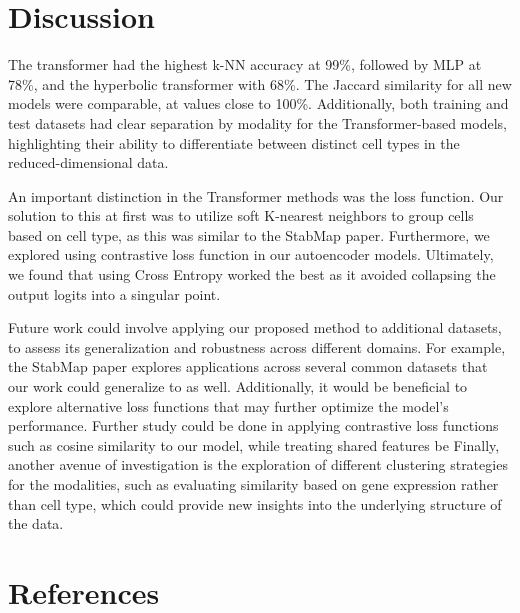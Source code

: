 \documentclass[11pt,a4paper]{article}
\begin{document}
\section{Discussion}



The transformer had the highest k-NN accuracy at 99\%, followed by MLP at 78\%, and the hyperbolic transformer with 68\%. The Jaccard similarity for all new models were comparable, at values close to 100\%. Additionally, both  training and test datasets had clear separation by modality for the Transformer-based models, highlighting their ability to differentiate between distinct cell types in the reduced-dimensional data.

An important distinction in the Transformer methods was the loss function. Our solution to this at first was to utilize soft K-nearest neighbors to group cells based on cell type, as this was similar to the StabMap paper. Furthermore, we explored using contrastive loss function in our autoencoder models. Ultimately, we found that using Cross Entropy worked the best as it avoided collapsing the output logits into a singular point.

Future work could involve applying our proposed method to additional datasets, to assess its generalization and robustness across different domains. For example, the StabMap paper explores applications across several common datasets that our work could generalize to as well. Additionally, it would be beneficial to explore alternative loss functions that may further optimize the model's performance. Further study could be done in applying contrastive loss functions such as cosine similarity to our model, while treating shared features be Finally, another avenue of investigation is the exploration of different clustering strategies for the modalities, such as evaluating similarity based on gene expression rather than cell type, which could provide new insights into the underlying structure of the data.
\section*{References}
\nocite{*}
\printbibliography[heading=none]
\end{document}
